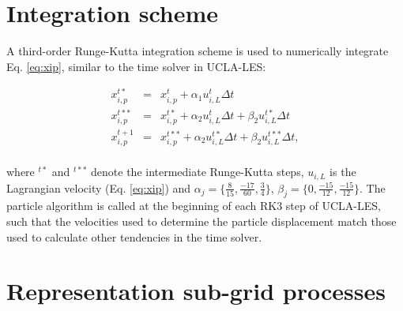 \documentclass[twoside,a4paper]{report}
\begin{document}
\section{Integration scheme}
\label{sec:integration}

A third-order Runge-Kutta integration scheme is used to numerically integrate Eq. \ref{eq:xip}, similar to the time solver in UCLA-LES:

\begin{eqnarray}
 x^{t*}_{i,p}   &=& x^{t}_{i,p}   + \alpha_1 u^t_{i,L}    \Delta t                                        \\
 x^{t**}_{i,p}  &=& x^{t*}_{i,p}  + \alpha_2 u^t_{i,L}    \Delta t  + \beta_2 u^{t*}_{i,L}  \Delta t      \nonumber \\
 x^{t+1}_{i,p}  &=& x^{t**}_{i,p} + \alpha_2 u^{t*}_{i,L} \Delta t  + \beta_2 u^{t**}_{i,L} \Delta t,     \nonumber \\
\end{eqnarray}

where $^{t*}$ and $^{t**}$ denote the intermediate Runge-Kutta steps, $u_{i,L}$ is the Lagrangian velocity (Eq. \ref{eq:xip}) and $\alpha_j = \{\frac{8}{15},\frac{-17}{60},\frac{3}{4}\}$, $\beta_j = \{0,\frac{-15}{12},\frac{-15}{12}\}$. The particle algorithm is called at the beginning of each RK3 step of UCLA-LES, such that the velocities used to determine the particle displacement match those used to calculate other tendencies in the time solver. 




\section{Representation sub-grid processes}
\label{sec:subgrid}
\end{document}
